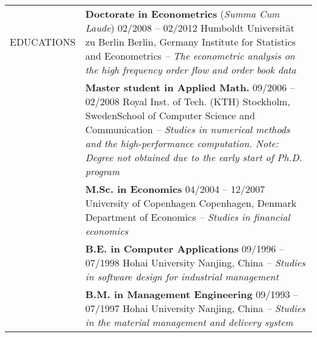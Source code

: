 \documentclass[a4paper,10pt]{article}
\begin{document}
\begin{longtable}[h]{p{}p{}}
EDUCATIONS
& \textbf{Doctorate in Econometrics} \small{(\emph{Summa Cum Laude})} \hfill 02/2008 -- 02/2012 \newline Humboldt Universit\"at zu Berlin \hfill Berlin, Germany \newline Institute for Statistics and Econometrics\newline
    \emph{-- The econometric analysis on the high frequency order flow and order book data}\\
  & \textbf{Master student in Applied Math.} \hfill 09/2006 -- 02/2008 \newline Royal Inst. of Tech. (KTH) \hfill Stockholm, Sweden\newline School of Computer Science and Communication \newline
  \emph{-- Studies in numerical methods and the high-performance computation. Note: Degree not obtained due to the early start of Ph.D. program } \\
  & \textbf{M.Sc. in Economics} \hfill 04/2004 -- 12/2007 \newline University of Copenhagen \hfill Copenhagen, Denmark  \newline Department of Economics \newline\emph{-- Studies in financial economics}\\
  & \textbf{B.E. in Computer Applications} \hfill 09/1996 -- 07/1998 \newline Hohai University \hfill Nanjing, China \newline\emph{-- Studies in software design for industrial management}\\
  & \textbf{B.M. in Management Engineering} \hfill 09/1993 -- 07/1997 \newline Hohai University \hfill Nanjing, China \newline\emph{-- Studies in the material management and delivery system}\\


\end{longtable}
\end{document}
